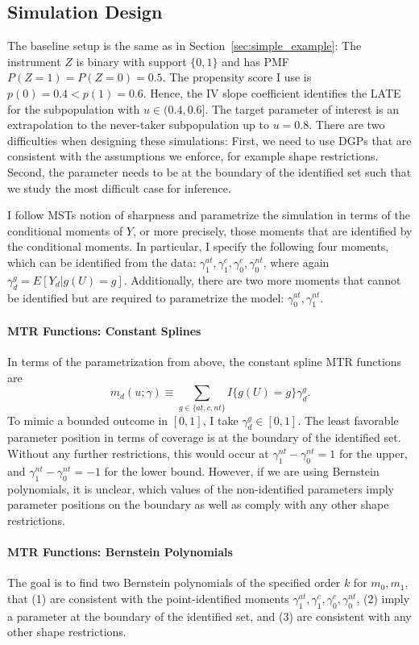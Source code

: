 \documentclass[12pt,a4paper,english]{article} %
\numberwithin{equation}{section}
\theoremstyle{definition}
\theoremstyle{remark}
\theoremstyle{plain}
\begin{document}
\subsection{Simulation Design}
The baseline setup is the same as in Section~\ref{sec:simple_example}:
The instrument $Z$ is binary with support $\{0,1\}$ and has PMF $P(Z=1) = P(Z=0) = 0.5$.
The propensity score I use is $p(0) = 0.4 < p(1) = 0.6$.
Hence, the IV slope coefficient identifies the LATE for the subpopulation with $u\in(0.4, 0.6]$.
The target parameter of interest is an extrapolation to the never-taker subpopulation up to $u=0.8$.
There are two difficulties when designing these simulations: First, we need to use DGPs that are consistent with the assumptions we enforce, for example shape restrictions.
Second, the parameter needs to be at the boundary of the identified set such that we study the most difficult case for inference.

I follow MSTs notion of sharpness and parametrize the simulation in terms of the conditional moments of $Y$, or more precisely, those moments that are identified by the conditional moments.
In particular, I specify the following four moments, which can be identified from the data: $\gamma_1^{at}, \gamma_1^{c}, \gamma_0^{c}, \gamma_0^{nt}$, where again $\gamma_d^g = E[Y_d|g(U)=g]$.
Additionally, there are two more moments that cannot be identified but are required to parametrize the model: $\gamma_0^{at}, \gamma_1^{nt}$.


\paragraph{MTR Functions: Constant Splines}
In terms of the parametrization from above, the constant spline MTR functions are
\begin{equation*}
  m_d(u; \gamma) \equiv \sum_{g\in\{at, c, nt\}} I\{g(U) = g\} \gamma_{d}^g.
\end{equation*}
To mimic a bounded outcome in $[0,1]$, I take $\gamma_d^g\in[0,1]$.
The least favorable parameter position in terms of coverage is at the boundary of the identified set.
Without any further restrictions, this would occur at $\gamma_1^{nt} - \gamma_0^{nt} = 1$ for the upper, and $\gamma_1^{nt} - \gamma_0^{nt} = -1$ for the lower bound.
However, if we are using Bernstein polynomials, it is unclear, which values of the non-identified parameters imply parameter positions on the boundary as well as comply with any other shape restrictions.

\paragraph{MTR Functions: Bernstein Polynomials}
The goal is to find two Bernstein polynomials of the specified order $k$ for $m_0, m_1$, that
(1) are consistent with the point-identified moments $\gamma_1^{at}, \gamma_1^c, \gamma_0^c, \gamma_0^{nt}$,
(2) imply a parameter at the boundary of the identified set, and
(3) are consistent with any other shape restrictions.
\end{document}
